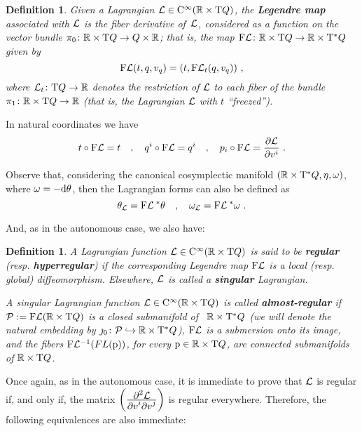 \documentclass[12pt]{report}
\newtheorem{definition}[teor]{Definition}
\def\beq{\begin{equation}}
\def\eeq{\end{equation}}
\def\derpar#1#2{\frac{\partial{#1}}{\partial{#2}}}
\def\Lag{{\cal L}}
\def\d{{\rm d}}
\def\Real{\mathbb{R}}
\def\Tan{{\rm T}}
\def\Cinfty{{\rm C}^\infty}
\begin{document}
\begin{definition}
\label{legmap}
Given a Lagrangian 
$\Lag\in\Cinfty(\Real\times\Tan Q)$,  the \textbf{Legendre map}
associated with $\Lag$ is the fiber derivative of~$\Lag$,
considered as a function on the vector bundle
$\pi_0 \colon\Real \times\Tan Q\to Q \times \Real$;
that is, the map
${\rm F}\Lag \colon\Real\times\Tan Q \to\Real\times\Tan^*Q$ 
given by
$$
{\rm F}\Lag (t,q,v_q) = \left(t,{\rm F}\Lag_t (q,v_q)\right)
\,,
$$
where $\Lag_t\colon\Tan Q\to\Real$ denotes the restriction of $\Lag$ to each fiber of the bundle $\pi_1\colon\Real\times\Tan Q \to\Real$
(that is, the Lagrangian $\Lag$ with $t$ ``freezed'').
\end{definition}

In natural coordinates we have
$$
t \circ {\rm F}\Lag = t \quad , \quad
q^i \circ {\rm F}\Lag = q^i \quad , \quad p_i \circ{\rm F}\Lag =\derpar{\Lag}{v^i} \ .
$$

Observe that, considering the canonical cosymplectic manifold
$(\Real\times\Tan^*Q,\eta,\omega)$, where $\omega=-\d\theta$, 
then the Lagrangian forms can also be defined as 
\beq
\label{flom}
\theta_\Lag={\rm F}\Lag^{\;*}\theta\quad , \quad\omega_\Lag={\rm F}\Lag^{\;*}\omega\ .
\eeq

And, as in the autonomous case, we also have:

\begin{definition}\label{de811}
A Lagrangian function $\Lag\in\Cinfty(\Real\times\Tan Q)$ is said
to be \textbf{regular}  (resp. \textbf{hyperregular}) if the corresponding
Legendre map ${\rm F}\Lag$ is a local (resp. global) diffeomorphism.
Elsewhere, $\Lag$ is called a \textbf{singular} Lagrangian.

A singular Lagrangian function $\Lag\in\Cinfty(\Real\times\Tan Q)$
 is called \textbf{almost-regular} if $\mathcal{P}:= {\rm F}\Lag(\Real\times\Tan Q)$ is
a closed submanifold of \ $\Real\times\Tan^*Q$ (we will denote
the natural embedding by $\jmath_0\colon\mathcal{P}\hookrightarrow\Real\times\Tan^*Q$), 
${\rm F}\Lag$ is a submersion onto its image, and
the fibers ${\rm F}\Lag^{-1}(FL({\rm p}))$, for every ${\rm p}\in \Real\times\Tan Q$, are
connected submanifolds of $\Real\times\Tan Q$.
\end{definition}

Once again, as in the autonomous case, it is immediate to prove that $\Lag$ is regular if, and only
if, the matrix $\left(\frac{\displaystyle\partial^2\Lag}
{\displaystyle\partial v^i
\partial v^j}\right)$ is regular everywhere.
Therefore, the following equivalences are also immediate:
\end{document}
